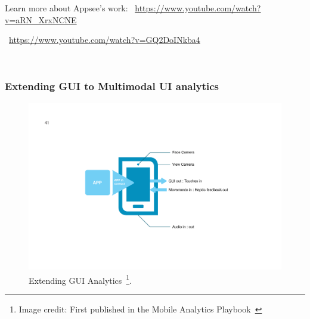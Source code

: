 Learn more about Appsee's work: ~\url{https://www.youtube.com/watch?v=aRN_XrxNCNE}

~\url{https://www.youtube.com/watch?v=GQ2DoINkba4}

~\subsubsection{Extending GUI to Multimodal UI analytics}

\begin{figure}
    \begin{minipage}{\textwidth}
    \centering
    \includegraphics[width=15cm]{images/mobile-analytics-playbook/Chart-11-extending-gui-analytics.png}
    \caption[Extending GUI Analytics]{Extending GUI Analytics~\footnote{Image credit: First published in the Mobile Analytics Playbook~\cite{harty_aymer_playbook_2016}}.}
    \label{fig:extending-gui-analytics}
    \end{minipage}
\end{figure}

